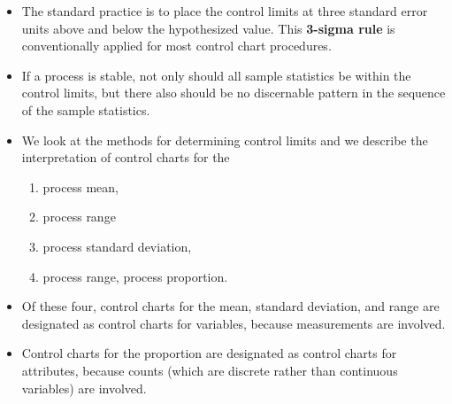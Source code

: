 \documentclass[]{report}
\begin{document}
{\begin{itemize}
\item The standard practice is to place the control limits at three standard error units above
and below the hypothesized value. This \textbf{3-sigma rule} is conventionally applied for
most control chart procedures.
\item If a process is stable, not only should all sample statistics be within the control limits,
but there also should be no discernable pattern in the sequence of the sample
statistics.
\item We look at the methods for determining control limits and we describe the
interpretation of control charts for the 
\begin{enumerate}
\item process mean,
\item process range
\item process standard deviation,
\item process range, process proportion.
\end{enumerate}


\item Of these four, control charts for the mean, standard deviation, and range are designated as control charts for variables, because measurements are involved.
\item Control charts for the proportion are designated as control charts for attributes,
because counts (which are discrete rather than continuous variables) are involved.
\end{itemize}


{
	\large
}

}
\end{document}
